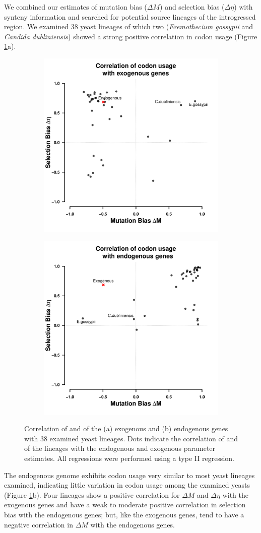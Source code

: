 \documentclass[12pt]{article}
\begin{document}
We combined our estimates of mutation bias ($\Delta M$) and selection bias ($\Delta \eta$) with synteny information and searched for potential source lineages of the introgressed region.
We examined 38 yeast lineages of which two (\emph{Eremothecium gossypii} and \emph{Candida dubliniensis}) showed a strong positive correlation in codon usage (Figure \ref{fig:csp_endo_exo_comp}a).
\begin{figure}[h]
    \centering
    \begin{subfigure}
        \centering
        \includegraphics[width=.45\textwidth]{img/csp_mean_correlation_exo.pdf}
    \end{subfigure}
    \begin{subfigure}
        \centering
        \includegraphics[width=.45\textwidth]{img/csp_mean_correlation_endo.pdf}
    \end{subfigure}
    \caption{Correlation of \DM and \DE of the (a) exogenous and (b) endogenous genes with 38 examined yeast lineages. Dots indicate the correlation of \DM and \DE of the lineages with the endogenous and exogenous parameter estimates. All regressions were performed using a type II regression.}
    \label{fig:csp_endo_exo_comp}
\end{figure}
The endogenous \kluyveri genome exhibits codon usage very similar to most yeast lineages examined, indicating little variation in codon usage among the examined yeasts (Figure \ref{fig:csp_endo_exo_comp}b).
Four lineages show a positive correlation for $\Delta M$ and $\Delta \eta$ with the exogenous genes and have a weak to moderate positive correlation in selection bias with the endogenous genes; but, like the exogenous genes, tend to have a negative correlation in $\Delta M$ with the endogenous genes.
\end{document}

